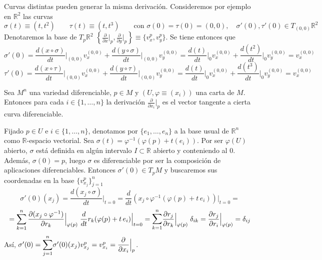 \begin{obs}
Curvas distintas pueden generar la misma derivación. Consideremos por ejemplo en $\mathbb{R}^2$ las curvas $$\sigma(t) \equiv (t,t^2) \qquad  \tau(t) \equiv (t,t^3) \qquad \text{con } \sigma(0) = \tau(0) = (0,0),\quad \sigma'(0), \tau'(0) \in T_{(0,0)}\mathbb{R}^2$$ Denotaremos la base de $T_p\mathbb{R}^2$ $\left\{{\frac{\partial}{\partial x}}{\big|_p}, {\frac{\partial}{\partial y}}{\big|_p}\right\} \equiv \{v_x^p,v_y^p\}$. Se tiene entonces que $$\sigma'(0) = \frac{d(x\circ \sigma)}{dt} \Big|_{(0,0)} v_x^{(0,0)} + \frac{d(y\circ \sigma)}{dt} \Big|_{(0,0)} v_y^{(0,0)} = \frac{d(t)}{dt}\Big|_0 v_x^{(0,0)} + \frac{d(t^2)}{dt}\Big|_0  v_y^{(0,0)} = v_x^{(0,0)}$$  
$$\tau'(0) = \frac{d(x\circ \tau)}{dt} \Big|_{(0,0)} v_x^{(0,0)} + \frac{d(y\circ \tau)}{dt} \Big|_{(0,0)} v_y^{(0,0)} = \frac{d(t)}{dt}\Big|_0 v_x^{(0,0)} + \frac{d(t^3)}{dt}\Big|_0  v_y^{(0,0)} = v_x^{(0,0)}$$  
\end{obs}

\begin{prop}
Sea $M^n$ una variedad diferenciable, $p\in M$ y $(U,\varphi\equiv(x_i))$ una carta de $M$. Entonces para cada $i \in  \{1,\dots,n\}$ la derivación $\frac{\partial}{\partial x_i} \big|_p$ es el vector tangente a cierta curva diferenciable.
\end{prop}
\begin{dem}
Fijado $p \in U$ e $i \in \{1,\dots,n\}$, denotamos por $\{e_1,\dots,e_n\}$ a la base usual de $\mathbb{R}^n$ como $\mathbb R$-espacio vectorial. Sea $\sigma(t) = \varphi^{-1}(\varphi(p)+t(e_i))$. Por ser $\varphi(U)$ abierto, $\sigma$ est\'a definida en algún intervalo $I \subset \mathbb{R}$ abierto y conteniendo al $0$. Adem\'as, $\sigma(0)=p$, luego $\sigma$ es diferenciable por ser la composición de aplicaciones diferenciables. Entonces $\sigma'(0) \in T_pM$ y buscaremos sus coordenadas en la base $\{v_{x_j}^p\}_{j=1}^n$
$$\sigma'(0)(x_j) = \frac{d(x_j \circ \sigma)}{dt}\Big|_{t=0} = \frac{d}{dt} (x_j \circ \varphi^{-1}(\varphi(p) + t\,e_i))|_{t=0} = $$ 
$$\displaystyle = \sum_{k=1}^n \frac{\partial (x_j \circ \varphi^{-1})}{\partial r_k}\Big|_{\varphi(p)}\; \frac{d}{dt} r_k(\varphi(p) + t\,e_i) \Big|_{t=0} =  \mathlarger{\sum}_{k=1}^n \frac{\partial r_j}{\partial r_k}\Big|_{\varphi(p)}\;\delta_{ik} = \frac{\partial r_j}{\partial r_i}\Big|_{\varphi(p)} = \delta_{ij}$$
Así, $\sigma'(0) = \mathlarger{\sum}_{j=1}^n \sigma'(0)(x_j) v_{x_j}^p = v_{x_i}^p=\pd{}{x_i}\Big|_p$.
\end{dem}

